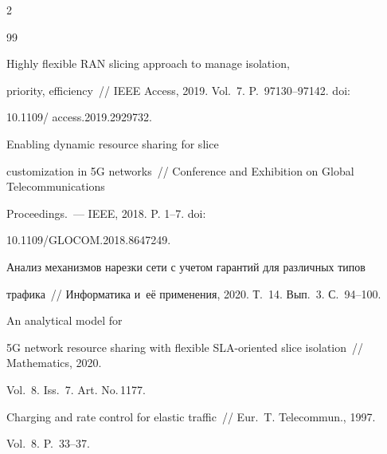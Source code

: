 \begin{multicols}{2}
{{\begin{thebibliography}{99}


 Highly flexible RAN slicing approach to manage isolation, 


priority, efficiency~// IEEE Access, 2019. Vol.~7. P.~97130--97142. doi: 


10.1109/ \mbox{access}.2019.2929732.







 Enabling dynamic resource sharing for slice 


customization in 5G networks~// Conference and Exhibition on Global Telecommunications 


Proceedings.~--- IEEE, 2018. P. 1--7. doi: 


10.1109/\mbox{GLOCOM}.2018.8647249. 






Анализ механизмов нарезки сети с учетом гарантий для различных типов 


трафика~// Информатика и~её применения, 2020. Т.~14. Вып.~3. С.~94--100.




 An analytical model for 


5G network resource sharing with flexible SLA-oriented slice isolation~// Mathematics, 2020. 


Vol.~8. Iss.~7. Art. No.\,1177.




 Charging and rate control for elastic traffic~// Eur.~T. Telecommun., 1997. 


Vol.~8. P.~33--37.


\end{thebibliography}





 }


 }





\end{multicols}





\vspace*{-5pt}





